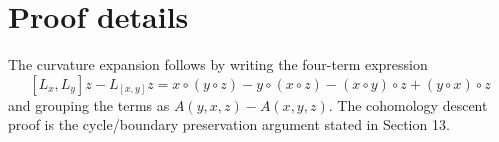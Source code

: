 \section{Proof details}

The curvature expansion follows by writing the four-term expression
\[
[L_x,L_y]z-L_{[x,y]}z=x\circ(y\circ z)-y\circ(x\circ z)-(x\circ y)\circ z+(y\circ x)\circ z
\]
and grouping the terms as $A(y,x,z)-A(x,y,z)$. The cohomology descent proof is the cycle/boundary preservation argument stated in Section 13.
